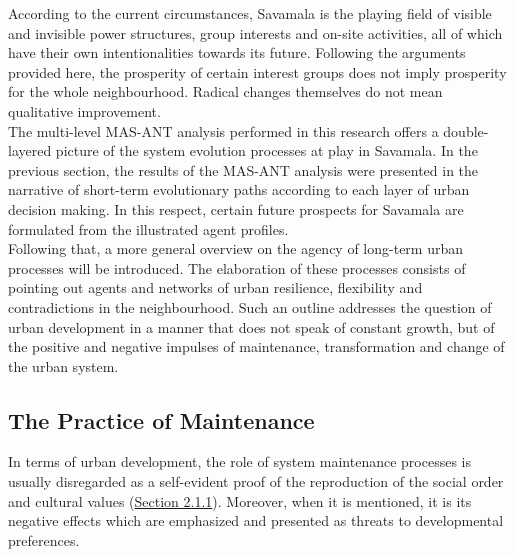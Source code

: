 \documentclass[11pt]{report}
\begin{document}
{{{According to the current circumstances, Savamala is the playing field of visible and invisible power structures, group interests and on-site activities, all of which have their own intentionalities towards its future. Following the arguments provided here, the prosperity of certain interest groups does not imply prosperity for the whole neighbourhood. Radical changes themselves do not mean qualitative improvement.
\\

The multi-level MAS-ANT analysis performed in this research offers a double-layered picture of the system evolution processes at play in Savamala.
In the previous section, the results of the MAS-ANT analysis were presented in the narrative of short-term evolutionary paths according to each layer of urban decision making.
In this respect, certain future prospects for Savamala are formulated from the illustrated agent profiles.
\\

Following that, a more general overview on the agency of long-term urban processes will be introduced. The elaboration of these processes consists of pointing out agents and networks of urban resilience, flexibility and contradictions in the neighbourhood. Such an outline addresses the question of urban development in a manner that  does not speak of constant growth, but of the positive and negative impulses of maintenance, transformation and change of the urban system.

\subsection{The Practice of Maintenance}

In terms of urban development, the role of system maintenance processes is usually disregarded as a self-evident proof of the reproduction of the social order and cultural values (\href{Section 2.1.1}{Section 2.1.1}). 
Moreover, when it is mentioned, it is its negative effects which are emphasized and presented as threats to developmental preferences.
\\

}}}
\end{document}
